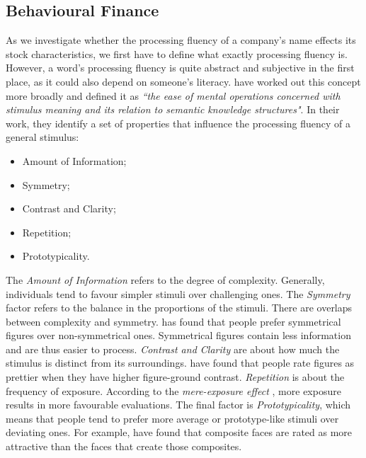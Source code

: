 \documentclass[11pt]{article}
\begin{document}
\subsection{Behavioural Finance}
As we investigate whether the processing fluency of a company's name effects its stock characteristics, we first have to define what exactly processing fluency is. However, a word's processing fluency is quite abstract and subjective in the first place, as it could also depend on someone's literacy. 
\cite{reber2004processing} have worked out this concept more broadly and defined it as \textit{``the ease of mental operations concerned with stimulus meaning and its relation to semantic knowledge structures"}. In their work, they identify a set of properties that influence the processing fluency of a general stimulus:
\vspace{0.25cm}
\begin{itemize}
    \setlength\itemsep{-0.5em}
    \item Amount of Information; 
    \item Symmetry;              
    \item Contrast and Clarity;  
    \item Repetition;            
    \item Prototypicality.       
\end{itemize}
\vspace{0.25cm}
The \textit{Amount of Information} refers to the degree of complexity. Generally, individuals tend to favour simpler stimuli over challenging ones. The \textit{Symmetry} factor refers to the balance in the proportions of the stimuli. There are overlaps between complexity and symmetry. \cite{garner2014processing} has found that people prefer symmetrical figures over non-symmetrical ones. Symmetrical figures contain less information and are thus easier to process. \textit{Contrast and Clarity} are about how much the stimulus is distinct from its surroundings. \cite{reber1998effects} have found that people rate figures as prettier when they have higher figure-ground contrast. \textit{Repetition} is about the frequency of exposure. According to the \textit{mere-exposure effect} \citep{zajonc1968attitudinal}, more exposure results in more favourable evaluations. The final factor is \textit{Prototypicality}, which means that people tend to prefer more average or prototype-like stimuli over deviating ones. For example, \cite{langlois1990attractive} have found that composite faces are rated as more attractive than the faces that create those composites.
\end{document}
